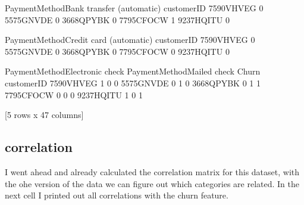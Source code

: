 \documentclass[letterpaper,10pt,english]{jupyterBook}
\begin{document}
\begin{sphinxVerbatim}[commandchars=\\\{\}]
            PaymentMethod\PYGZus{}Bank transfer (automatic)  \PYGZbs{}
customerID                                            
7590\PYGZhy{}VHVEG                                        0   
5575\PYGZhy{}GNVDE                                        0   
3668\PYGZhy{}QPYBK                                        0   
7795\PYGZhy{}CFOCW                                        1   
9237\PYGZhy{}HQITU                                        0   

            PaymentMethod\PYGZus{}Credit card (automatic)  \PYGZbs{}
customerID                                          
7590\PYGZhy{}VHVEG                                      0   
5575\PYGZhy{}GNVDE                                      0   
3668\PYGZhy{}QPYBK                                      0   
7795\PYGZhy{}CFOCW                                      0   
9237\PYGZhy{}HQITU                                      0   

            PaymentMethod\PYGZus{}Electronic check  PaymentMethod\PYGZus{}Mailed check  Churn  
customerID                                                                     
7590\PYGZhy{}VHVEG                               1                           0      0  
5575\PYGZhy{}GNVDE                               0                           1      0  
3668\PYGZhy{}QPYBK                               0                           1      1  
7795\PYGZhy{}CFOCW                               0                           0      0  
9237\PYGZhy{}HQITU                               1                           0      1  

[5 rows x 47 columns]
\end{sphinxVerbatim}


\subsection{correlation}
\label{\detokenize{c7_case_studies/Churn:correlation}}
\sphinxAtStartPar
I went ahead and already calculated the correlation matrix for this dataset, with the ohe version of the data we can figure out which categories are related.
In the next cell I printed out all correlations with the churn feature.

\begin{sphinxVerbatim}[commandchars=\\\{\}]
  
\PYG{p}{[}\PYG{p}{]}
\end{sphinxVerbatim}
\end{document}
